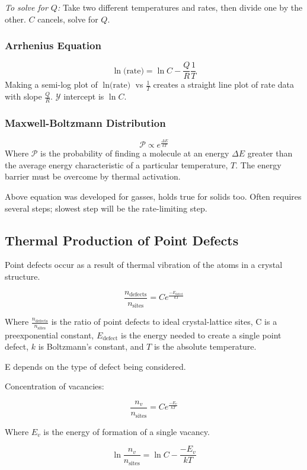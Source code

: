 \documentclass[10pt,letterpaper]{article}
\begin{document}
	\textit{To solve for $Q$:} Take two different temperatures and rates, then divide one by the other.  $C$ cancels, solve for $Q$. 
	
	\subsubsection*{Arrhenius Equation}
	$$
	\ln \text{(rate)} = \ln C - \frac{Q}{R} \frac{1}{T}
	$$
	Making a semi-log plot of $\ln \text{(rate)}$ vs $\frac{1}{T}$ creates a straight line plot of rate data with slope $\frac{Q}{R}$.  $\mathcal Y$ intercept is $\ln C$. 
	
	\subsubsection*{Maxwell-Boltzmann Distribution}
	\begin{large}
		$$
		\mathcal P \propto e^{\frac{\Delta E}{kT}}
		$$
		Where $\mathcal P$ is the probability of finding a molecule at an energy $\Delta E$ greater than the average energy characteristic of a particular temperature, $T$. The energy barrier must be overcome by thermal activation. 
		
		Above equation was developed for gasses, holds true for solids too. Often requires several steps; slowest step will be the rate-limiting step. 
	\end{large}
	\subsection{Thermal Production of Point Defects}
	Point defects occur as a result of thermal vibration of the atoms in a crystal structure. 
	\begin{Large}
		$$
		\frac{n_{\text{defects}}}{n_{\text{sites}}} = Ce^\frac{-E_{\text{defect}}}{kT}
		$$
	\end{Large}
	Where $\frac{n_{\text{defects}}}{n_{\text{sites}}}$ is the ratio of point defects to ideal crystal-lattice sites, C is a preexponential constant, $E_{\text{defect}}$ is the energy needed to create a single point defect, $k$ is Boltzmann's constant, and $T$ is the absolute temperature. 
	
	E depends on the type of defect being considered. 
	
	Concentration of vacancies: 
	\begin{Large}
		$$
		\frac{n_v}{n_{\text{sites}}} = Ce^{\frac{-E_v}{kT}}
		$$
	\end{Large}
	Where $E_v$ is the energy of formation of a single vacancy. 
	\begin{Large}
		$$
		\ln \frac{n_v}{n_{\text{sites}}} = \ln C - \frac{-E_v}{kT}
		$$
	\end{Large}
\end{document}
